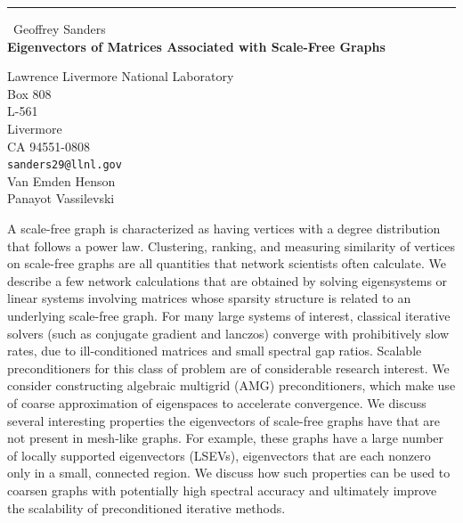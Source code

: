 \documentclass{report}
\begin{document}
\begin{center}
\rule{6in}{1pt} \
{\large Geoffrey Sanders \\
{\bf Eigenvectors of Matrices Associated with Scale-Free Graphs}}

Lawrence Livermore National Laboratory \\ Box 808 \\ L-561 \\ Livermore \\ CA 94551-0808
\\
{\tt sanders29@llnl.gov}\\
Van Emden Henson\\
Panayot Vassilevski\end{center}

A scale-free graph is characterized as having vertices with a degree
distribution that follows a power law. Clustering, ranking, and measuring
similarity of vertices on scale-free graphs are all quantities that
network scientists often calculate. We describe a few network
calculations that are obtained by solving eigensystems or linear systems
involving matrices whose sparsity structure is related to an underlying
scale-free graph. For many large systems of interest, classical iterative
solvers (such as conjugate gradient and lanczos) converge with
prohibitively slow rates, due to ill-conditioned matrices and small
spectral gap ratios. Scalable preconditioners for this class of problem
are of considerable research interest. We consider constructing algebraic
multigrid (AMG) preconditioners, which make use of coarse approximation
of eigenspaces to accelerate convergence. We discuss several interesting
properties the eigenvectors of scale-free graphs have that are not
present in mesh-like graphs. For example, these graphs have a large
number of locally supported eigenvectors (LSEVs), eigenvectors that are
each nonzero only in a small, connected region. We discuss how such
properties can be used to coarsen graphs with potentially high spectral
accuracy and ultimately improve the scalability of preconditioned
iterative methods.
\end{document}
